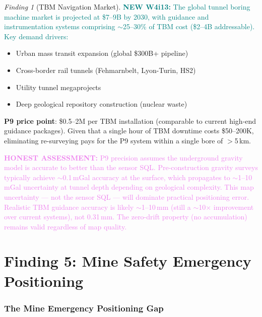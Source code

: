 \documentclass[11pt]{article}
\theoremstyle{definition}
\theoremstyle{remark}
\newtheorem{finding}[theorem]{Finding}
\newcommand{\honest}[1]{\textcolor{violet}{\textbf{HONEST ASSESSMENT:} #1}}
\newcommand{\newfinding}[1]{\textcolor{teal}{\textbf{NEW W4i13:} #1}}
\begin{document}
\begin{finding}[TBM Navigation Market]
\label{find:tbm-market}
\newfinding{The global tunnel boring machine market is projected at
\$7--9B by 2030, with guidance and instrumentation systems comprising
$\sim$25--30\% of TBM cost (\$2--4B addressable). Key demand drivers:}
\begin{itemize}[nosep]
\item Urban mass transit expansion (global \$300B+ pipeline)
\item Cross-border rail tunnels (Fehmarnbelt, Lyon-Turin, HS2)
\item Utility tunnel megaprojects
\item Deep geological repository construction (nuclear waste)
\end{itemize}

\textbf{P9 price point}: \$0.5--2M per TBM installation (comparable
to current high-end guidance packages). Given that a single hour of
TBM downtime costs \$50--200K, eliminating re-surveying pays for the
P9 system within a single bore of $>$5\,km.
\end{finding}

\honest{P9 precision assumes the underground gravity model is accurate
to better than the sensor SQL. Pre-construction gravity surveys
typically achieve $\sim$0.1\,mGal accuracy at the surface, which
propagates to $\sim$1--10\,mGal uncertainty at tunnel depth depending
on geological complexity. This map uncertainty --- not the sensor SQL
--- will dominate practical positioning error. Realistic TBM guidance
accuracy is likely $\sim$1--10\,mm (still a $\sim$10$\times$
improvement over current systems), not 0.31\,mm. The zero-drift
property (no accumulation) remains valid regardless of map quality.}

\part{Finding 5: Mine Safety Emergency Positioning}
\label{part:mine-safety}

\section{The Mine Emergency Positioning Gap}
\label{sec:mine-gap}
\end{document}

